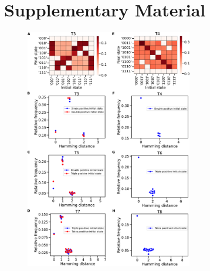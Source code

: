 \documentclass[11pt,a4paper]{article}
\newcommand{\beginsupplement}{
        \setcounter{table}{0}
        \renewcommand{\thetable}{S\arabic{table}}
        \setcounter{figure}{0}
        \renewcommand{\thefigure}{S\arabic{figure}}
        \setcounter{equation}{0}
        \renewcommand{\theequation}{S\arabic{equation}}
        \pagenumbering{Roman}
        \setcounter{subsection}{0}
        \renewcommand{\thesubsection}{S.\arabic{subsection}}
        \setcounter{subsubsection}{0}
        \renewcommand{\thesubsubsection}{S.\arabic{subsection}.\arabic{subsubsection}}
     }
\theoremstyle{definition}
\theoremstyle{remark}
\begin{document}
\section*{Supplementary Material}
\beginsupplement
\begin{figure}[h]
    \centering
    \begin{subfigure}[c]{\textwidth}
        \label{T3-sthmap}
    \end{subfigure}
    \begin{subfigure}[c]{\textwidth}
        \label{T3-stham}
    \end{subfigure}
    \begin{subfigure}[c]{\textwidth}
        \label{T5-stham}
    \end{subfigure}
    \begin{subfigure}[c]{\textwidth}
        \label{T7-stham}
    \end{subfigure}
    \begin{subfigure}[c]{\textwidth}
        \label{T4-sthmap}
    \end{subfigure}
    \begin{subfigure}[c]{\textwidth}
        \label{T4-stham}
    \end{subfigure}
    \begin{subfigure}[c]{\textwidth}
        \label{T6-stham}
    \end{subfigure}
    \begin{subfigure}[c]{\textwidth}
        \label{T8-stham}
    \end{subfigure}
    \includegraphics[width=0.65\textwidth]{figures/State_trans} 

\end{figure}
\end{document}
